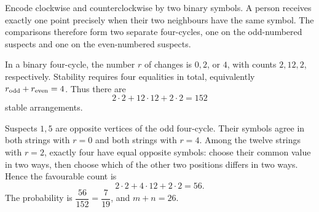 Encode clockwise and counterclockwise by two binary symbols. A person receives exactly one point precisely when their two neighbours have the same symbol. The comparisons therefore form two separate four-cycles, one on the odd-numbered suspects and one on the even-numbered suspects.

In a binary four-cycle, the number $r$ of changes is $0,2$, or $4$, with counts $2,12,2$, respectively. Stability requires four equalities in total, equivalently $r_{\rm odd}+r_{\rm even}=4$. Thus there are
\[
2\cdot2+12\cdot12+2\cdot2=152
\]
stable arrangements.

Suspects $1,5$ are opposite vertices of the odd four-cycle. Their symbols agree in both strings with $r=0$ and both strings with $r=4$. Among the twelve strings with $r=2$, exactly four have equal opposite symbols: choose their common value in two ways, then choose which of the other two positions differs in two ways. Hence the favourable count is
\[
2\cdot2+4\cdot12+2\cdot2=56.
\]
The probability is $\dfrac{56}{152}=\dfrac{7}{19}$, and $\boxed{m+n=26}$.
